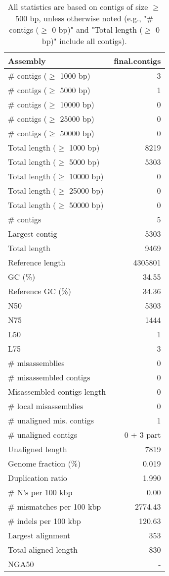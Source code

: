 \documentclass[12pt,a4paper]{article}
\begin{document}
\begin{table}[ht]
\begin{center}
\caption{All statistics are based on contigs of size $\geq$ 500 bp, unless otherwise noted (e.g., "\# contigs ($\geq$ 0 bp)" and "Total length ($\geq$ 0 bp)" include all contigs).}
\begin{tabular}{|l*{1}{|r}|}
\hline
Assembly & final.contigs \\ \hline
\# contigs ($\geq$ 1000 bp) & 3 \\ \hline
\# contigs ($\geq$ 5000 bp) & 1 \\ \hline
\# contigs ($\geq$ 10000 bp) & 0 \\ \hline
\# contigs ($\geq$ 25000 bp) & 0 \\ \hline
\# contigs ($\geq$ 50000 bp) & 0 \\ \hline
Total length ($\geq$ 1000 bp) & 8219 \\ \hline
Total length ($\geq$ 5000 bp) & 5303 \\ \hline
Total length ($\geq$ 10000 bp) & 0 \\ \hline
Total length ($\geq$ 25000 bp) & 0 \\ \hline
Total length ($\geq$ 50000 bp) & 0 \\ \hline
\# contigs & 5 \\ \hline
Largest contig & 5303 \\ \hline
Total length & 9469 \\ \hline
Reference length & 4305801 \\ \hline
GC (\%) & 34.55 \\ \hline
Reference GC (\%) & 34.36 \\ \hline
N50 & 5303 \\ \hline
N75 & 1444 \\ \hline
L50 & 1 \\ \hline
L75 & 3 \\ \hline
\# misassemblies & 0 \\ \hline
\# misassembled contigs & 0 \\ \hline
Misassembled contigs length & 0 \\ \hline
\# local misassemblies & 0 \\ \hline
\# unaligned mis. contigs & 1 \\ \hline
\# unaligned contigs & 0 + 3 part \\ \hline
Unaligned length & 7819 \\ \hline
Genome fraction (\%) & 0.019 \\ \hline
Duplication ratio & 1.990 \\ \hline
\# N's per 100 kbp & 0.00 \\ \hline
\# mismatches per 100 kbp & 2774.43 \\ \hline
\# indels per 100 kbp & 120.63 \\ \hline
Largest alignment & 353 \\ \hline
Total aligned length & 830 \\ \hline
NGA50 & - \\ \hline
\end{tabular}
\end{center}
\end{table}
\end{document}
